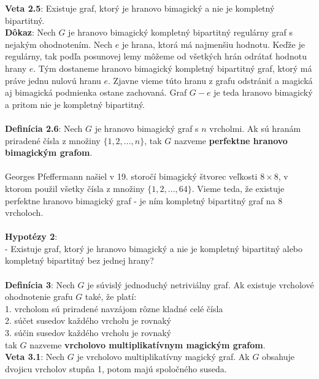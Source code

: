 \documentclass[12pt]{article}
\begin{document}
\textbf{Veta 2.5}: Existuje graf, ktorý je hranovo bimagický a nie je kompletný bipartitný. \\

\textbf{Dôkaz}: Nech $G$ je hranovo bimagický kompletný bipartitný regulárny graf s nejakým ohodnotením. Nech $e$ je hrana, ktorá má najmenšiu hodnotu. Keďže je regulárny, tak podľa posunovej lemy môžeme od všetkých hrán odrátať hodnotu hrany $e$. Tým dostaneme hranovo bimagický kompletný bipartitný graf, ktorý má práve jednu nulovú hranu $e$. Zjavne vieme túto hranu z grafu odstrániť a magická aj bimagická podmienka ostane zachovaná. Graf $G - e$ je teda hranovo bimagický a pritom nie je kompletný bipartitný. \\\\

\textbf{Definícia 2.6}: Nech $G$ je hranovo bimagický graf s $n$ vrcholmi. Ak sú hranám priradené čísla z množiny $\{1, 2, ... , n\}$, tak $G$ nazveme \textbf{perfektne hranovo bimagickým grafom}. \\\\

Georges Pfeffermann našiel v 19. storočí bimagický štvorec veľkosti $8 \times 8$, v ktorom použil všetky čísla z množiny $\{1, 2, ... , 64\}$. Vieme teda, že existuje perfektne hranovo bimagický graf - je ním kompletný bipartitný graf na $8$ vrcholoch. \\\\

\textbf{Hypotézy 2}: \\
- Existuje graf, ktorý je hranovo bimagický a nie je kompletný bipartitný alebo kompletný bipartitný bez jednej hrany? \\\\

\textbf{Definícia 3}: Nech $G$ je súvislý jednoduchý netriviálny graf. Ak existuje vrcholové ohodnotenie grafu $G$ také, že platí: \\
1. vrcholom sú priradené navzájom rôzne kladné celé čísla \\
2. súčet susedov každého vrcholu je rovnaký \\
3. súčin susedov každého vrcholu je rovnaký \\
tak $G$ nazveme \textbf{vrcholovo multiplikatívnym magickým grafom}. \\

\textbf{Veta 3.1}: Nech $G$ je vrcholovo multiplikatívny magický graf. Ak $G$ obsahuje dvojicu vrcholov stupňa 1, potom majú spoločného suseda. \\
\end{document}
